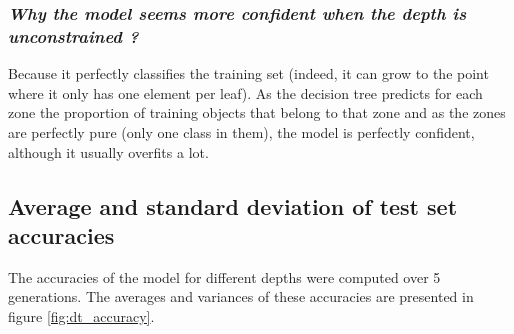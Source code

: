 \subsubsection{{\it Why the model seems more confident when the depth is unconstrained ?}}
Because it perfectly classifies the training set (indeed, it can grow to the point where it only has one element per leaf). As the decision tree predicts for each zone the proportion of training objects that belong to that zone and as the zones are perfectly pure (only one class in them), the model is perfectly confident, although it usually overfits a lot.

\subsection{Average and standard deviation of test set accuracies}
The accuracies of the model for different depths were computed over 5 generations. The averages and variances of these accuracies are presented in figure \ref{fig:dt_accuracy}.
